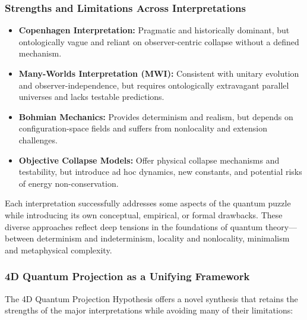 \documentclass[12pt]{article}
\begin{document}
\subsubsection*{Strengths and Limitations Across Interpretations}

\begin{itemize}
    \item \textbf{Copenhagen Interpretation:}  
    Pragmatic and historically dominant, but ontologically vague and reliant on observer-centric collapse without a defined mechanism.

    \item \textbf{Many-Worlds Interpretation (MWI):}  
    Consistent with unitary evolution and observer-independence, but requires ontologically extravagant parallel universes and lacks testable predictions.

    \item \textbf{Bohmian Mechanics:}  
    Provides determinism and realism, but depends on configuration-space fields and suffers from nonlocality and extension challenges.

    \item \textbf{Objective Collapse Models:}  
    Offer physical collapse mechanisms and testability, but introduce ad hoc dynamics, new constants, and potential risks of energy non-conservation.
\end{itemize}

Each interpretation successfully addresses some aspects of the quantum puzzle while introducing its own conceptual, empirical, or formal drawbacks. These diverse approaches reflect deep tensions in the foundations of quantum theory—between determinism and indeterminism, locality and nonlocality, minimalism and metaphysical complexity.

\subsubsection*{4D Quantum Projection as a Unifying Framework}

The 4D Quantum Projection Hypothesis offers a novel synthesis that retains the strengths of the major interpretations while avoiding many of their limitations:
\end{document}
